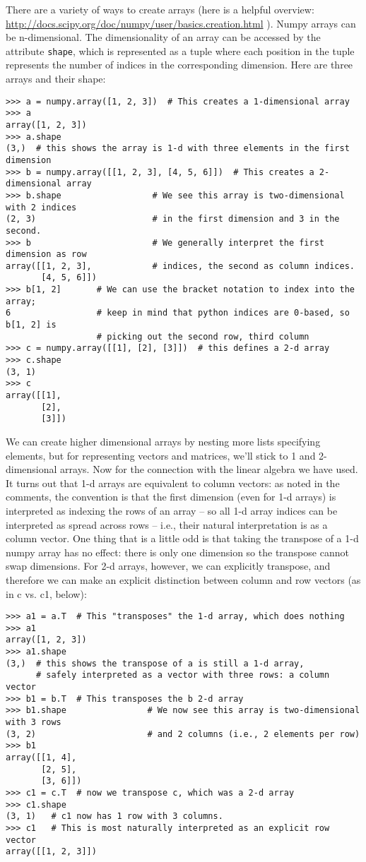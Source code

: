 \documentclass[10pt]{article}
\begin{document}
There are a variety of ways to create arrays (here is a helpful overview: \url{http://docs.scipy.org/doc/numpy/user/basics.creation.html} ). Numpy arrays can be n-dimensional.  The dimensionality of an array can be accessed by the attribute {\tt shape}, which is represented as a tuple where each position in the tuple represents the number of indices in the corresponding dimension.  Here are three arrays and their shape:
\begin{verbatim}
>>> a = numpy.array([1, 2, 3])  # This creates a 1-dimensional array
>>> a
array([1, 2, 3]) 
>>> a.shape
(3,)  # this shows the array is 1-d with three elements in the first dimension
>>> b = numpy.array([[1, 2, 3], [4, 5, 6]])  # This creates a 2-dimensional array
>>> b.shape                  # We see this array is two-dimensional with 2 indices 
(2, 3)                       # in the first dimension and 3 in the second.
>>> b                        # We generally interpret the first dimension as row  
array([[1, 2, 3],            # indices, the second as column indices.
       [4, 5, 6]])
>>> b[1, 2]       # We can use the bracket notation to index into the array;
6                 # keep in mind that python indices are 0-based, so b[1, 2] is
                  # picking out the second row, third column
>>> c = numpy.array([[1], [2], [3]])  # this defines a 2-d array
>>> c.shape
(3, 1)
>>> c
array([[1],
       [2],
       [3]])
\end{verbatim}
We can create higher dimensional arrays by nesting more lists specifying elements, but for representing vectors and matrices, we'll stick to 1 and 2-dimensional arrays.  Now for the connection with the linear algebra we have used.  It turns out that 1-d arrays are equivalent to column vectors: as noted in the comments, the convention is that the first dimension (even for 1-d arrays) is interpreted as indexing the rows of an array -- so all 1-d array indices can be interpreted as spread across rows -- i.e., their natural interpretation is as a column vector.  One thing that is a little odd is that taking the transpose of a 1-d numpy array has no effect: there is only one dimension so the transpose cannot swap dimensions.  For 2-d arrays, however, we can explicitly transpose, and therefore we can make an explicit distinction between column and row vectors (as in c vs. c1, below):
\begin{verbatim}
>>> a1 = a.T  # This "transposes" the 1-d array, which does nothing
>>> a1
array([1, 2, 3]) 
>>> a1.shape
(3,)  # this shows the transpose of a is still a 1-d array,
      # safely interpreted as a vector with three rows: a column vector
>>> b1 = b.T  # This transposes the b 2-d array
>>> b1.shape                # We now see this array is two-dimensional with 3 rows 
(3, 2)                      # and 2 columns (i.e., 2 elements per row)
>>> b1
array([[1, 4],
       [2, 5],
       [3, 6]])
>>> c1 = c.T  # now we transpose c, which was a 2-d array
>>> c1.shape
(3, 1)   # c1 now has 1 row with 3 columns.
>>> c1   # This is most naturally interpreted as an explicit row vector
array([[1, 2, 3]])
\end{verbatim}
\end{document}
